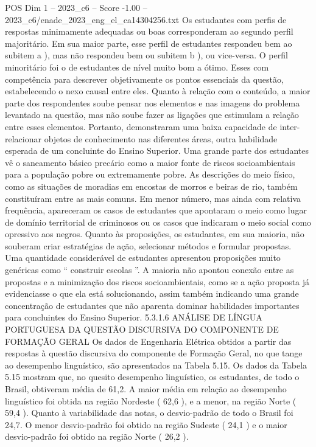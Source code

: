 \begin{textsample}{POS Dim 1 – 2023\_c6 – Score -1.00 – 2023\_c6/enade\_2023\_eng\_el\_ca14304256.txt}
Os estudantes com perfis de respostas minimamente adequadas ou boas corresponderam ao segundo perfil majoritário.
Em sua maior parte, esse perfil de estudantes respondeu bem ao subitem a ), mas não respondeu bem ou subitem b ), ou vice-versa.
O perfil minoritário foi o de estudantes de nível muito bom a ótimo.
Esses com competência para descrever objetivamente os pontos essenciais da questão, estabelecendo o nexo causal entre eles.
Quanto à relação com o conteúdo, a maior parte dos respondentes soube pensar nos elementos e nas imagens do problema levantado na questão, mas não soube fazer as ligações que estimulam a relação entre esses elementos.
Portanto, demonstraram uma baixa capacidade de inter-relacionar objetos de conhecimento nas diferentes áreas, outra habilidade esperada de um concluinte do Ensino Superior.
Uma grande parte dos estudantes vê o saneamento básico precário como a maior fonte de riscos socioambientais para a população pobre ou extremamente pobre.
As descrições do meio físico, como as situações de moradias em encostas de morros e beiras de rio, também constituíram entre as mais comuns.
Em menor número, mas ainda com relativa frequência, apareceram os casos de estudantes que apontaram o meio como lugar de domínio territorial de criminosos ou os casos que indicaram o meio social como opressivo aos negros.
Quanto às proposições, os estudantes, em sua maioria, não souberam criar estratégias de ação, selecionar métodos e formular propostas.
Uma quantidade considerável de estudantes apresentou proposições muito genéricas como “ construir escolas ”.
A maioria não apontou conexão entre as propostas e a minimização dos riscos socioambientais, como se a ação proposta já evidenciasse o que ela está solucionando, assim também indicando uma grande concentração de estudantes que não aparenta dominar habilidades importantes para concluintes do Ensino Superior. 5.3.1.6 ANÁLISE DE LÍNGUA PORTUGUESA DA QUESTÃO DISCURSIVA DO COMPONENTE DE FORMAÇÃO GERAL Os dados de Engenharia Elétrica obtidos a partir das respostas à questão discursiva do componente de Formação Geral, no que tange ao desempenho linguístico, são apresentados na Tabela 5.15.
Os dados da Tabela 5.15 mostram que, no quesito desempenho linguístico, os estudantes, de todo o Brasil, obtiveram média de 61,2.
A maior média em relação ao desempenho linguístico foi obtida na região Nordeste ( 62,6 ), e a menor, na região Norte ( 59,4 ).
Quanto à variabilidade das notas, o desvio-padrão de todo o Brasil foi 24,7.
O menor desvio-padrão foi obtido na região Sudeste ( 24,1 ) e o maior desvio-padrão foi obtido na região Norte ( 26,2 ).

\end{textsample}
